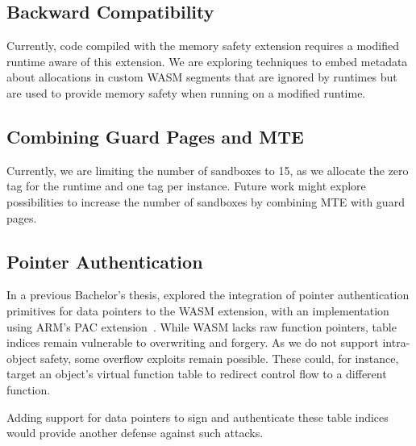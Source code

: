\subsection{Backward Compatibility}
\label{subsec:backward-compatibility}

Currently, code compiled with the memory safety extension requires a modified runtime aware of this extension.
We are exploring techniques to embed metadata about allocations in custom \ac{WASM} segments that are ignored by runtimes but are used to provide memory safety when running on a modified runtime.

\subsection{Combining Guard Pages and \ac{MTE}}
\label{subsec:combining-guard-pages-and-mte}

Currently, we are limiting the number of sandboxes to 15, as we allocate the zero tag for the runtime and one tag per instance.
Future work might explore possibilities to increase the number of sandboxes by combining \ac{MTE} with guard pages.

\subsection{Pointer Authentication}
\label{subsec:future-work-pac}

In a previous Bachelor's thesis, \citeauthor{rehde2023wasm} explored the integration of pointer authentication primitives for data pointers to the \ac{WASM} extension, with an implementation using ARM's \ac{PAC} extension~\cite{rehde2023wasm}.
While \ac{WASM} lacks raw function pointers, table indices remain vulnerable to overwriting and forgery.
As we do not support intra-object safety, some overflow exploits remain possible.
These could, for instance, target an object's virtual function table to redirect control flow to a different function.

Adding support for data pointers to sign and authenticate these table indices would provide another defense against such attacks.
